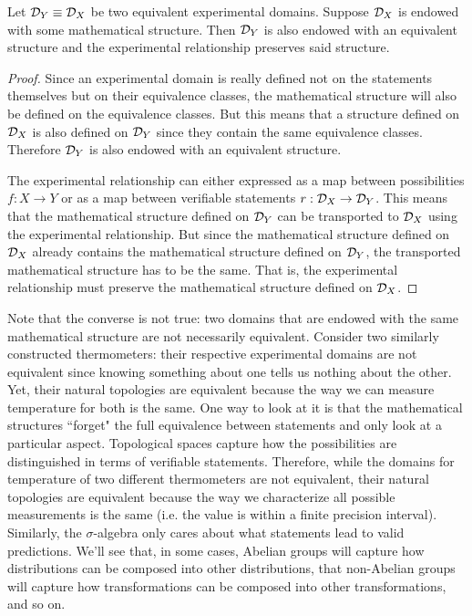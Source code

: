 \documentclass[11pt,letterpaper,fleqn]{memoir} %
\begin{document}
\begin{mathSection}
	\begin{thrm}\label{thrm_domain_equivalence_is_isomorphism}
		Let $\mathcal{D}_Y \equiv \mathcal{D}_X$ be two equivalent experimental domains. Suppose $\mathcal{D}_X$ is endowed with some mathematical structure. Then $\mathcal{D}_Y$ is also endowed with an equivalent structure and the experimental relationship preserves said structure.
	\end{thrm}
\begin{proof}
	Since an experimental domain is really defined not on the statements themselves but on their equivalence classes, the mathematical structure will also be defined on the equivalence classes. But this means that a structure defined on $\mathcal{D}_X$ is also defined on $\mathcal{D}_Y$ since they contain the same equivalence classes. Therefore $\mathcal{D}_Y$ is also endowed with an equivalent structure.
	
	The experimental relationship can either expressed as a map between possibilities $f : X \to Y$ or as a map between verifiable statements $r : \mathcal{D}_X \to \mathcal{D}_Y$. This means that the mathematical structure defined on $\mathcal{D}_Y$ can be transported to $\mathcal{D}_X$ using the experimental relationship. But since the mathematical structure defined on $\mathcal{D}_X$ already contains the mathematical structure defined on $\mathcal{D}_Y$, the transported mathematical structure has to be the same. That is, the experimental relationship must preserve the mathematical structure defined on $\mathcal{D}_X$.
\end{proof}
\end{mathSection}

Note that the converse is not true: two domains that are endowed with the same mathematical structure are not necessarily equivalent. Consider two similarly constructed thermometers: their respective experimental domains are not equivalent since knowing something about one tells us nothing about the other. Yet, their natural topologies are equivalent because the way we can measure temperature for both is the same. One way to look at it is that the mathematical structures ``forget" the full equivalence between statements and only look at a particular aspect. Topological spaces capture how the possibilities are distinguished in terms of verifiable statements. Therefore, while the domains for temperature of two different thermometers are not equivalent, their natural topologies are equivalent because the way we characterize all possible measurements is the same (i.e. the value is within a finite precision interval). Similarly, the $\sigma$-algebra only cares about what statements lead to valid predictions. We'll see that, in some cases, Abelian groups will capture how distributions can be composed into other distributions, that non-Abelian groups will capture how transformations can be composed into other transformations, and so on.
\end{document}
